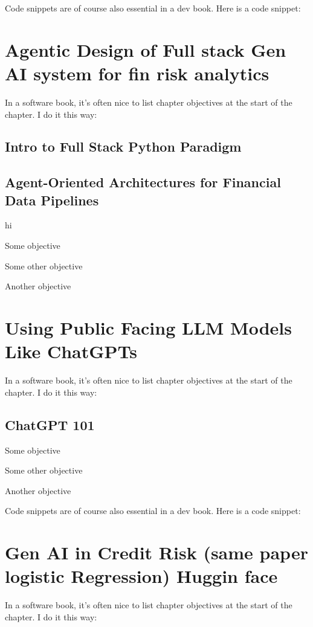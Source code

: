 \documentclass[a4paper,headinclude=on,footinclude=on,12pt,oneside]{scrbook}
\begin{document}
Code snippets are of course also essential in a dev book. Here is a code snippet:



\chapter{Agentic Design of Full stack Gen AI system for fin risk analytics}
In a software book, it's often nice to list chapter objectives at the start of the chapter. I do it this way:
\section{Intro to Full Stack Python Paradigm}

\section{Agent-Oriented Architectures for Financial Data Pipelines}
hi
\begin{arrows}
	\item Some objective
	\item Some other objective
	\item Another objective
\end{arrows}





\chapter{ Using Public Facing LLM Models Like ChatGPTs }
In a software book, it's often nice to list chapter objectives at the start of the chapter. I do it this way:
\section{ChatGPT 101}
\begin{arrows}
	\item Some objective
	\item Some other objective
	\item Another objective
\end{arrows}


Code snippets are of course also essential in a dev book. Here is a code snippet:




\chapter{Gen AI in Credit Risk (same paper logistic Regression) Huggin face}
In a software book, it's often nice to list chapter objectives at the start of the chapter. I do it this way:
\end{document}
